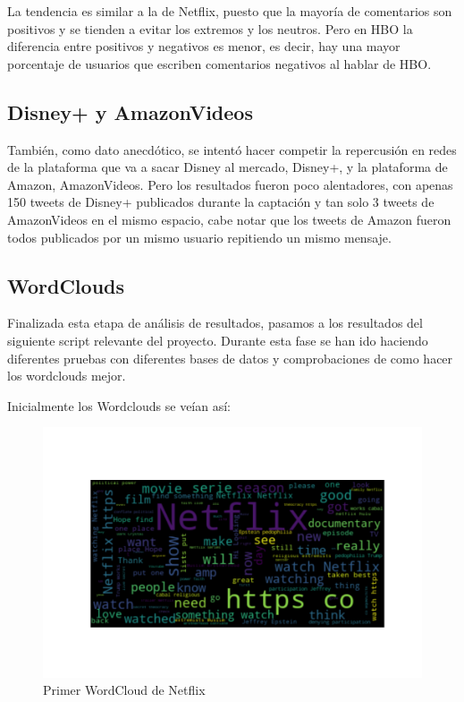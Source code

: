 La tendencia es similar a la de Netflix, puesto que la mayoría de comentarios son positivos y se tienden a evitar los extremos y los neutros. Pero en HBO la diferencia entre positivos y negativos es menor, es decir, hay una mayor porcentaje de usuarios que escriben comentarios negativos al hablar de HBO. 



\subsection{Disney+ y AmazonVideos}

También, como dato anecdótico, se intentó hacer competir la repercusión en redes de la plataforma que va a sacar Disney al mercado, Disney+, y la plataforma de Amazon, AmazonVideos. Pero los resultados fueron poco alentadores, con apenas 150 tweets de Disney+ publicados durante la captación y tan solo 3 tweets de AmazonVideos en el mismo espacio, cabe notar que los tweets de Amazon fueron todos publicados por un mismo usuario repitiendo un mismo mensaje. 



\subsection{WordClouds}

Finalizada esta etapa de análisis de resultados, pasamos a los resultados del siguiente script relevante del proyecto. Durante esta fase se han ido haciendo diferentes pruebas con diferentes bases de datos y comprobaciones de como hacer los wordclouds mejor. 

Inicialmente los Wordclouds se veían así: 

\begin{figure}[H]
	\centering
	\includegraphics[scale=.5]{imagenes/WordCloudNetflix1.png}
	\caption{Primer WordCloud de Netflix}
	\label{fig:wordcloudNetflix1}
\end{figure} 

